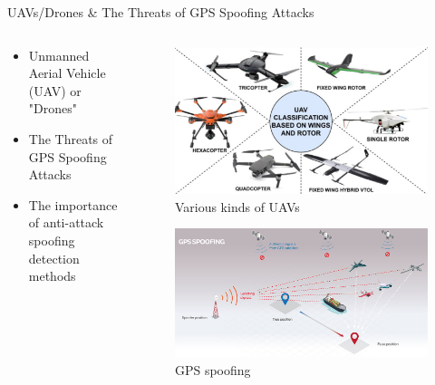 \documentclass[aspectratio=169, 8pt]{beamer}
\begin{document}
\begin{frame}{UAVs/Drones \& The Threats of GPS Spoofing Attacks}

\begin{columns}
    \begin{column}{0.5 \linewidth}
        \begin{itemize}
            \item \large{Unmanned Aerial Vehicle (UAV) or "Drones"}
            \item The Threats of GPS Spoofing Attacks
            \item The importance of anti-attack spoofing detection methods
        \end{itemize}
    \end{column}

    \begin{column}{0.5 \linewidth}

        \begin{figure}
            \centering
            \includegraphics[width = 0.5\linewidth]{images/Detail-Guide-about-UAV-Technology-Supporting-Aerial-Task-Operations-Google-Docs.jpeg}
            \caption{Various kinds of UAVs}
            \label{fig:enter-label}
        \end{figure}
        
        \begin{figure}
            \centering
            \includegraphics[width = 0.7\linewidth]{images/spoofing-Honeywell-alternative-navigation-W.jpg}
            \caption{GPS spoofing}
            \label{fig:enter-label}
        \end{figure}
        
    \end{column}
\end{columns}

\end{frame}
\end{document}
